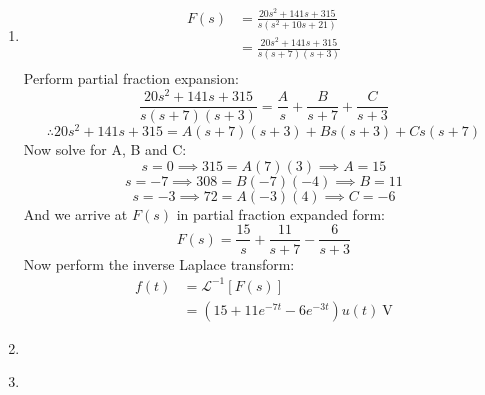 \begin{enumerate}
	\item{
		\begin{align*}
			F(s) &= \frac{20s^2+141s+315}{s \left(s^2+10s+21 \right)} \\
			&= \frac{20s^2+141s+315}{s(s+7)(s+3)} \\
		\end{align*}
		Perform partial fraction expansion:
		\begin{equation*}
			\frac{20s^2+141s+315}{s(s+7)(s+3)} = \frac{A}{s} + \frac{B}{s+7} + \frac{C}{s+3}
		\end{equation*}
		\begin{equation*}
			\therefore 20s^2+141s+315 = A(s+7)(s+3) + Bs(s+3) + Cs(s+7)
		\end{equation*}
		Now solve for A, B and C:
		\begin{equation*}
			s = 0 \implies 315 = A(7)(3) \implies A = 15
		\end{equation*}
		\begin{equation*}
			s = -7 \implies 308 = B(-7)(-4) \implies B = 11
		\end{equation*}
		\begin{equation*}
			s = -3 \implies 72 = A(-3)(4) \implies C = -6
		\end{equation*}
		And we arrive at $F(s)$ in partial fraction expanded form:
		\begin{equation*}
			F(s) = \frac{15}{s} + \frac{11}{s+7} - \frac{6}{s+3}
		\end{equation*}
		Now perform the inverse Laplace transform:
		\begin{align*}
			f(t) &= \mathcal{L}^{-1}[F(s)] \\
			&= \left(15 + 11e^{-7t} - 6e^{-3t} \right) u(t) \ \mathrm{V}
		\end{align*}
	}
	\item{
	}
	\item{
	}
	
\end{enumerate}
